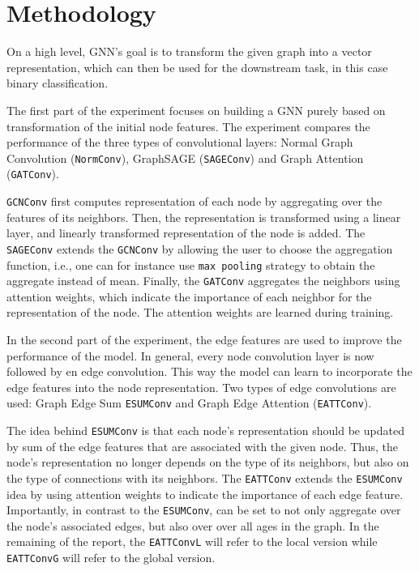 \documentclass[10pt,twocolumn]{article}
\begin{document}
\section{Methodology}\label{sec:methodology}
On a high level, GNN's goal is to transform the given
graph into a vector representation, which can then be used
for the downstream task, in this case binary classification.

The first part of the experiment focuses on building a GNN purely
based on transformation of the initial node features. The experiment compares the performance of the
three types of convolutional layers: Normal Graph Convolution (\texttt{NormConv}), 
GraphSAGE (\texttt{SAGEConv}) and Graph Attention (\texttt{GATConv}).

\texttt{GCNConv} first computes representation of each node by aggregating
over the features of its neighbors. Then, the representation is transformed
using a linear layer, and linearly transformed representation of the node is added.
The \texttt{SAGEConv} extends the \texttt{GCNConv} by allowing the user to 
choose the aggregation function, i.e., one can for instance use \texttt{max pooling}
strategy to obtain the aggregate instead of mean. Finally, the \texttt{GATConv} aggregates
the neighbors using attention weights, which indicate the importance of each neighbor 
for the representation of the node. The attention weights are learned during training.

In the second part of the experiment, the edge features are used to improve the performance
of the model. In general, every node convolution layer is now followed by en edge convolution.
This way the model can learn to incorporate the edge features into the node representation.
Two types of edge convolutions are used: Graph Edge Sum \texttt{ESUMConv} and Graph Edge Attention
(\texttt{EATTConv}).

The idea behind \texttt{ESUMConv} is that each node's representation should be updated 
by sum of the edge features that are associated with the given node. Thus, the node's
representation no longer depends on the type of its neighbors, but also on the type of
connections with its neighbors. The \texttt{EATTConv} extends the \texttt{ESUMConv}
idea by using attention weights to indicate the importance of each edge feature. Importantly,
in contrast to the \texttt{ESUMConv}, can be set to not only aggregate over the node's associated edges,
but also over over all ages in the graph. In the remaining of the report, the \texttt{EATTConvL} will refer
to the local version while \texttt{EATTConvG} will refer to the global version.
\end{document}
